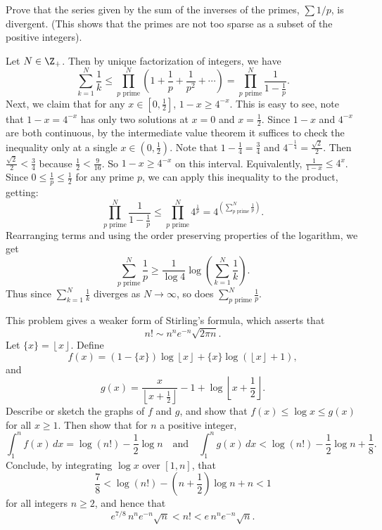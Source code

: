 \documentclass[11pt,letterpaper]{article}
\begin{document}
\begin{problem}
    Prove that the series given by the sum of the inverses of the primes, $\sum 1/p$, is divergent. (This shows that the primes are not too sparse as a subset of the positive integers).
\end{problem}

\begin{solution}
    Let $N\in \Z_+$. Then by unique factorization of integers, we have
    \[
        \sum^N_{k=1} \frac{1}{k} \leq \prod_{p\textrm{ prime}}^N\left(1+\frac{1}{p}+\frac{1}{p^2}+\cdots\right)=\prod^N_{p\textrm{ prime}}\frac{1}{1-\frac{1}{p}}
    .\] 
    Next, we claim that for any $x\in [0, \frac{1}{2}]$, $1-x\geq 4^{-x}$. This is easy to see, note that $1-x=4^{-x}$ has only two solutions at $x=0$ and $x=\frac{1}{2}$. Since $1-x$ and $4^{-x}$ are both continuous, by the intermediate value theorem it suffices to check the inequality only at a single $x\in (0, \frac{1}{2})$. Note that $1-\frac{1}{4}=\frac{3}{4}$ and $4^{-\frac{1}{4}}=\frac{\sqrt{2}}{2}$. Then $\frac{\sqrt{2}}{2}<\frac{3}{4}$ because $\frac{1}{2}<\frac{9}{16}$. So $1-x\geq 4^{-x}$ on this interval. 
    Equivalently, $\frac{1}{1-x}\leq 4^x$. Since $0\leq \frac{1}{p}\leq \frac{1}{2}$ for any prime $p$, we can apply this inequality to the product, getting: 
    \[
        \prod_{p\textrm{ prime}}^N \frac{1}{1-\frac{1}{p}}\leq \prod_{p\textrm{ prime}}^N 4^{\frac{1}{p}}=4^{\left(\sum^N_{p\textrm{ prime}}\frac{1}{p}\right)}
    .\] 
    Rearranging terms and using the order preserving properties of the logarithm, we get
    \[
        \sum^N_{p\textrm{ prime}} \frac{1}{p}\geq \frac{1}{\log{4}}\log\left(\sum^N_{k=1}\frac{1}{k}\right)
    .\]
    Thus since $\sum^N_{k=1}\frac{1}{k}$ diverges as $N\to \infty$, so does $\sum^N_{p\textrm{ prime}}\frac{1}{p}$. 
\end{solution}


\begin{problem}
    This problem gives a weaker form of Stirling's formula, which asserts that 
    \[
        n!\sim n^n e^{-n} \sqrt{2\pi n}.
    \]
    Let $\{x\}=\left\lfloor x \right\rfloor$. Define 
    \[f(x)=(1-\{x\})\log \left\lfloor x \right\rfloor+\{x\}\log(\left\lfloor x \right\rfloor +1),\] 
    and \[g(x)=\frac{x}{\left\lfloor x+\frac{1}{2} \right\rfloor}-1+\log \left\lfloor x+\frac{1}{2} \right\rfloor.\]
    Describe or sketch the graphs of $f$ and $g$, and show that $f(x)\leq \log x\leq g(x)$ for all $x\geq 1$. Then show that for $n$ a positive integer, 
    \[
        \int_1^n f(x)\,dx=\log(n!)-\frac12 \log n \quad \textrm{and}\quad \int_1^n g(x)\,dx < \log(n!)-\frac{1}{2} \log n + \frac{1}{8}.
    \]
    Conclude, by integrating $\log x$ over $[1,n]$, that 
    \[
        \frac{7}{8} < \log(n!)-\left(n+\frac{1}{2}\right)\log n+n<1
    \]
    for all integers $n\geq 2$, and hence that 
    \[
        e^{7/8}\,n^n e^{-n} \sqrt{n} < n! < e\,n^n e^{-n} \sqrt{n}.
    \]
\end{problem}
\end{document}
